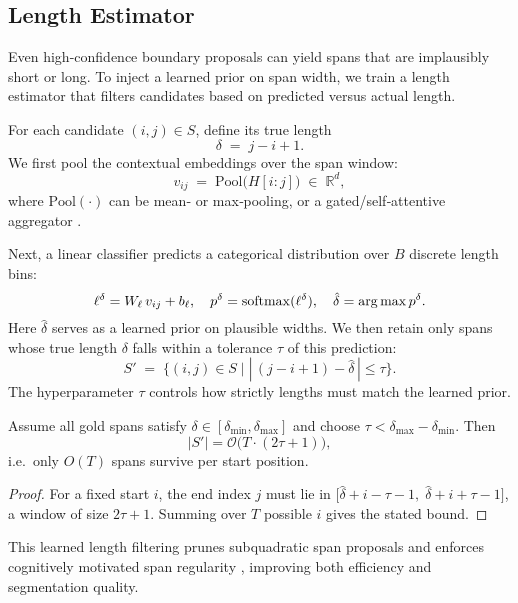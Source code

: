 \subsection{Length Estimator}

Even high-confidence boundary proposals can yield spans that are implausibly short or long. To inject a learned prior on span width, we train a length estimator that filters candidates based on predicted versus actual length.

For each candidate \((i,j)\in S\), define its true length
\[
\delta \;=\; j - i + 1.
\]
We first pool the contextual embeddings over the span window:
\[
v_{ij} \;=\; \mathrm{Pool}\bigl(H[i{:}j]\bigr)\;\in\;\mathbb{R}^d,
\]
where \(\mathrm{Pool}(\cdot)\) can be mean‐ or max‐pooling, or a gated/self‐attentive aggregator \cite{tay2021charformer}.  

Next, a linear classifier predicts a categorical distribution over \(B\) discrete length bins:
\[
\ell^\delta = W_\ell\,v_{ij} + b_\ell,
\quad
p^\delta = \mathrm{softmax}(\ell^\delta),
\quad
\hat\delta = \arg\max p^\delta.
\]
Here \(\hat\delta\) serves as a learned prior on plausible widths. We then retain only spans whose true length \(\delta\) falls within a tolerance \(\tau\) of this prediction:
\[
S' \;=\; \bigl\{(i,j)\in S \;\big|\; |\,(j-i+1) - \hat\delta\,|\le \tau \bigr\}.
\]
The hyperparameter \(\tau\) controls how strictly lengths must match the learned prior.

\begin{proposition}
	Assume all gold spans satisfy \(\delta\in[\delta_{\min},\delta_{\max}]\) and choose \(\tau<\delta_{\max}-\delta_{\min}\). Then
	\[
	|S'| = \mathcal{O}\bigl(T\cdot(2\tau+1)\bigr),
	\]
	i.e.\ only \(O(T)\) spans survive per start position.
\end{proposition}
\begin{proof}
	For a fixed start \(i\), the end index \(j\) must lie in
	\(\bigl[\hat\delta + i-\tau-1,\;\hat\delta + i+\tau-1\bigr]\),
	a window of size \(2\tau+1\). Summing over \(T\) possible \(i\) gives the stated bound.
\end{proof}

This learned length filtering prunes subquadratic span proposals and enforces cognitively motivated span regularity \cite{jackendoff1977xbar}, improving both efficiency and segmentation quality.